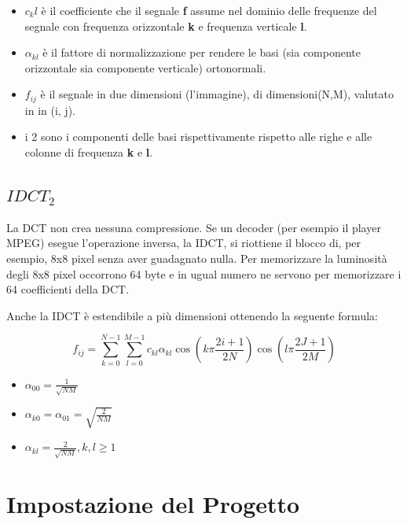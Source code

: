 \documentclass[a4paper,12pt,titlepage,oneside]{book}
\begin{document}
\begin{itemize}
  \item \textbf{$c_kl$} è il coefficiente che il segnale \textbf{f} assume nel dominio delle frequenze del segnale con frequenza  orizzontale \textbf{k} e frequenza verticale \textbf{l}.
  \item \textbf{$\alpha_{kl}$}  è il fattore di normalizzazione per rendere le basi (sia componente orizzontale sia componente verticale) ortonormali.
  \item $f_{ij}$ è il segnale in due dimensioni (l’immagine), di dimensioni(N,M), valutato in in (i, j).
  \item i 2 \textbf{\cos} sono i componenti delle basi rispettivamente rispetto
alle righe e alle colonne di frequenza \textbf{k} e \textbf{l}.
  
\end{itemize}


\section{$IDCT_2$}
La DCT non crea nessuna compressione. Se un decoder (per esempio il player MPEG) esegue l’operazione inversa, la IDCT, si riottiene il blocco di, per esempio, 8x8 pixel senza aver guadagnato nulla. Per memorizzare la luminosità degli 8x8 pixel occorrono 64 byte e in ugual numero ne servono per memorizzare i 64 coefficienti della DCT.

Anche la IDCT è estendibile a più dimensioni ottenendo la seguente formula:

\begin{equation}
    f_{ij} = \sum^{N-1}_{k=0} \sum^{M-1}_{l=0} c_{kl} \alpha_{kl} \cos ( k \pi \frac{2i + 1}{2N} ) \cos ( l \pi \frac{2J + 1}{2M} )
\end{equation}

\begin{itemize}

\item $\alpha_{00} = \frac{1}{\sqrt{NM}}$
\item $\alpha_{k0} = \alpha_{01} = \sqrt{\frac{2}{NM}}$
\item $\alpha_{kl} = \frac{2}{\sqrt{NM}}, k, l \geq 1$

\end{itemize}

\chapter{Impostazione del Progetto}
\end{document}
